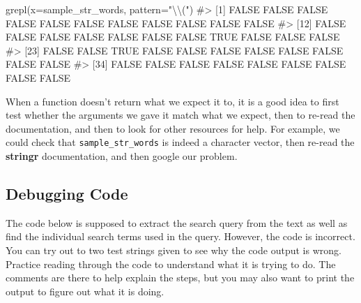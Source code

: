 \documentclass[
  letterpaper,
]{krantz}
\makeatletter
\newenvironment{Shaded}{\begin{snugshade}}{\end{snugshade}}
\newcommand{\AttributeTok}[1]{\textcolor[rgb]{0.40,0.45,0.13}{#1}}
\newcommand{\CommentTok}[1]{\textcolor[rgb]{0.37,0.37,0.37}{#1}}
\newcommand{\FunctionTok}[1]{\textcolor[rgb]{0.28,0.35,0.67}{#1}}
\newcommand{\NormalTok}[1]{\textcolor[rgb]{0.00,0.23,0.31}{#1}}
\newcommand{\SpecialCharTok}[1]{\textcolor[rgb]{0.37,0.37,0.37}{#1}}
\newcommand{\StringTok}[1]{\textcolor[rgb]{0.13,0.47,0.30}{#1}}
\newenvironment{kframe}{%
\medskip{}
\setlength{\fboxsep}{.8em}
 \def\at@end@of@kframe{}%
 \ifinner\ifhmode%
  \def\at@end@of@kframe{\end{minipage}}%
  \begin{minipage}{\columnwidth}%
 \fi\fi%
 \def\FrameCommand##1{\hskip\@totalleftmargin \hskip-\fboxsep
 \colorbox{shadecolor}{##1}\hskip-\fboxsep
     \hskip-\linewidth \hskip-\@totalleftmargin \hskip\columnwidth}%
 \MakeFramed {\advance\hsize-\width
   \@totalleftmargin\z@ \linewidth\hsize
   \@setminipage}}%
 {\par\unskip\endMakeFramed%
 \at@end@of@kframe}
\renewenvironment{Shaded}{\begin{kframe}}{\end{kframe}}
\makeatother
\begin{document}
\begin{Shaded}
\begin{Highlighting}[]
\FunctionTok{grepl}\NormalTok{(}\AttributeTok{x=}\NormalTok{sample\_str\_words, }\AttributeTok{pattern=}\StringTok{"}\SpecialCharTok{\textbackslash{}\textbackslash{}}\StringTok{("}\NormalTok{)}
\CommentTok{\#\textgreater{}  [1] FALSE FALSE FALSE FALSE FALSE FALSE FALSE FALSE FALSE FALSE FALSE}
\CommentTok{\#\textgreater{} [12] FALSE FALSE FALSE FALSE FALSE FALSE FALSE  TRUE FALSE FALSE FALSE}
\CommentTok{\#\textgreater{} [23] FALSE FALSE  TRUE FALSE FALSE FALSE FALSE FALSE FALSE FALSE FALSE}
\CommentTok{\#\textgreater{} [34] FALSE FALSE FALSE FALSE FALSE FALSE FALSE FALSE FALSE}
\end{Highlighting}
\end{Shaded}

When a function doesn't return what we expect it to, it is a good idea
to first test whether the arguments we gave it match what we expect,
then to re-read the documentation, and then to look for other resources
for help. For example, we could check that \texttt{sample\_str\_words}
is indeed a character vector, then re-read the \textbf{stringr}
documentation, and then google our problem.

\subsection{Debugging Code}\label{debugging-code}

The code below is supposed to extract the search query from the text as
well as find the individual search terms used in the query. However, the
code is incorrect. You can try out to two test strings given to see why
the code output is wrong. Practice reading through the code to
understand what it is trying to do. The comments are there to help
explain the steps, but you may also want to print the output to figure
out what it is doing.
\end{document}
